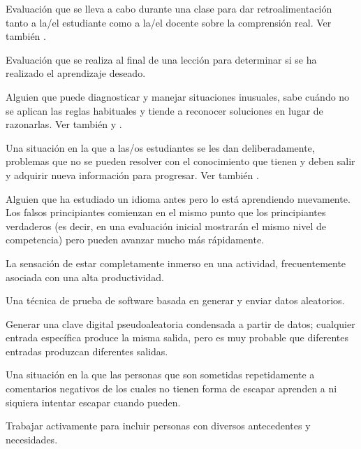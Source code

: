 \begin{description}
 Evaluación que se lleva a cabo
durante una clase para dar retroalimentación tanto a la/el estudiante como a la/el docente
sobre la comprensión real. Ver también .

 Evaluación que se realiza al final de una lección para determinar si se ha realizado el aprendizaje deseado.

 Alguien que puede diagnosticar y manejar situaciones inusuales,  sabe cuándo no se aplican las reglas habituales y tiende a reconocer soluciones en lugar de razonarlas.
Ver también 
y .

 Una situación en la que a las/os estudiantes se les dan deliberadamente, problemas que no se pueden resolver con el conocimiento que tienen y deben salir y adquirir nueva información para progresar.
Ver también .

 Alguien que ha estudiado un idioma antes pero lo está aprendiendo nuevamente. Los falsos principiantes comienzan en el mismo punto que los principiantes verdaderos (es decir, en una evaluación inicial mostrarán el mismo nivel de competencia) pero pueden avanzar mucho más rápidamente.

 La sensación de estar completamente inmerso en una actividad,
frecuentemente asociada con una alta productividad.

 Una técnica de prueba de software
basada en generar y enviar datos aleatorios.

 Generar una clave digital pseudoaleatoria condensada a partir de datos; cualquier entrada específica produce la misma salida, pero es muy probable que diferentes entradas produzcan diferentes salidas.

 Una situación en la que las personas que son sometidas repetidamente a comentarios negativos de los cuales no tienen forma de escapar aprenden a ni siquiera intentar escapar cuando pueden.

 Trabajar activamente para incluir
personas con diversos antecedentes y necesidades.


\end{description}
